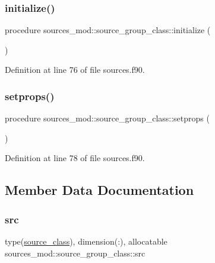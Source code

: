 \subsubsection{\texorpdfstring{initialize()}{initialize()}}
{\footnotesize\ttfamily procedure sources\+\_\+mod\+::source\+\_\+group\+\_\+class\+::initialize (\begin{DoxyParamCaption}{ }\end{DoxyParamCaption})\hspace{0.3cm}{\ttfamily [private]}}



Definition at line 76 of file sources.\+f90.

\mbox{\label{structsources__mod_1_1source__group__class_af66df271111f0d2734b1e5122e42438e}} 
\subsubsection{\texorpdfstring{setprops()}{setprops()}}
{\footnotesize\ttfamily procedure sources\+\_\+mod\+::source\+\_\+group\+\_\+class\+::setprops (\begin{DoxyParamCaption}{ }\end{DoxyParamCaption})\hspace{0.3cm}{\ttfamily [private]}}



Definition at line 78 of file sources.\+f90.



\subsection{Member Data Documentation}
\mbox{\label{structsources__mod_1_1source__group__class_af970ce2c935528f707bdbf4169995d7c}} 
\subsubsection{\texorpdfstring{src}{src}}
{\footnotesize\ttfamily type(\mbox{\hyperlink{structsources__mod_1_1source__class}{source\+\_\+class}}), dimension(\+:), allocatable sources\+\_\+mod\+::source\+\_\+group\+\_\+class\+::src\hspace{0.3cm}{\ttfamily [private]}}



